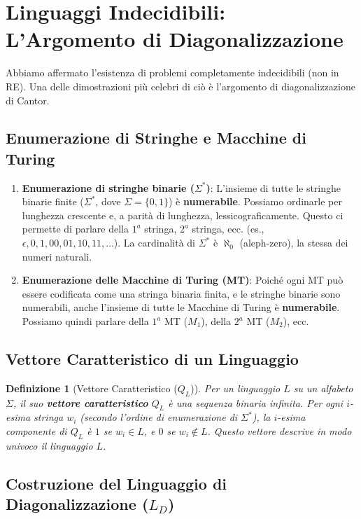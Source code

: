 \documentclass[a4paper, 11pt]{book} %
\newtheorem{definition}[theorem]{Definizione}
\theoremstyle{definition}
\begin{document}
\section{Linguaggi Indecidibili: L'Argomento di Diagonalizzazione}

Abbiamo affermato l'esistenza di problemi completamente indecidibili (non in RE). Una delle dimostrazioni più celebri di ciò è l'argomento di diagonalizzazione di Cantor.

\subsection{Enumerazione di Stringhe e Macchine di Turing}

\begin{enumerate}
    \item \textbf{Enumerazione di stringhe binarie ($\Sigma^*$)}: L'insieme di tutte le stringhe binarie finite ($\Sigma^*$, dove $\Sigma = \{0,1\}$) è \textbf{numerabile}. Possiamo ordinarle per lunghezza crescente e, a parità di lunghezza, lessicograficamente. Questo ci permette di parlare della $1^{a}$ stringa, $2^{a}$ stringa, ecc. (es., $\epsilon, 0, 1, 00, 01, 10, 11, \dots$). La cardinalità di $\Sigma^*$ è $\aleph_0$ (aleph-zero), la stessa dei numeri naturali.
    \item \textbf{Enumerazione delle Macchine di Turing (MT)}: Poiché ogni MT può essere codificata come una stringa binaria finita, e le stringhe binarie sono numerabili, anche l'insieme di tutte le Macchine di Turing è \textbf{numerabile}. Possiamo quindi parlare della $1^{a}$ MT ($M_1$), della $2^{a}$ MT ($M_2$), ecc.
\end{enumerate}

\subsection{Vettore Caratteristico di un Linguaggio}

\begin{definition}[Vettore Caratteristico ($Q_L$)]
Per un linguaggio $L$ su un alfabeto $\Sigma$, il suo \textbf{vettore caratteristico} $Q_L$ è una sequenza binaria infinita. Per ogni $i$-esima stringa $w_i$ (secondo l'ordine di enumerazione di $\Sigma^*$), la $i$-esima componente di $Q_L$ è $1$ se $w_i \in L$, e $0$ se $w_i \notin L$. Questo vettore descrive in modo univoco il linguaggio $L$.
\end{definition}

\subsection{Costruzione del Linguaggio di Diagonalizzazione ($L_D$)}
\end{document}

